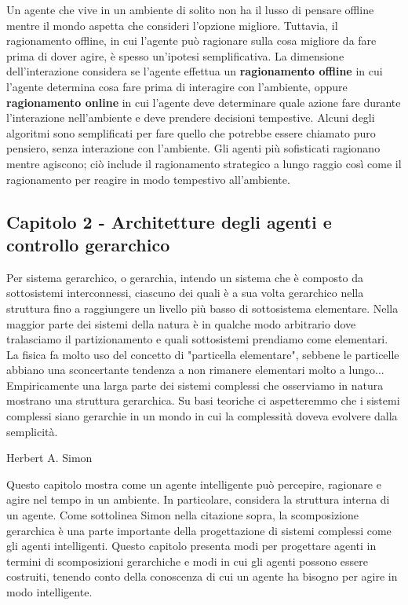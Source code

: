 \documentclass[a4paper]{extarticle}
\begin{document}
Un agente che vive in un ambiente di solito non ha il lusso di pensare offline mentre il mondo aspetta che consideri l'opzione migliore. Tuttavia, il ragionamento offline, in cui l'agente può ragionare sulla cosa migliore da fare prima di dover agire, è spesso un'ipotesi semplificativa. La dimensione dell'interazione considera se l'agente effettua un \textbf{ragionamento offline} in cui l'agente determina cosa fare prima di interagire con l'ambiente, oppure \textbf{ragionamento online} in cui l'agente deve determinare quale azione fare durante l'interazione nell'ambiente e deve prendere decisioni tempestive. Alcuni degli algoritmi sono semplificati per fare quello che potrebbe essere chiamato puro pensiero, senza interazione con l'ambiente. Gli agenti più sofisticati ragionano mentre agiscono; ciò include il ragionamento strategico a lungo raggio così come il ragionamento per reagire in modo tempestivo all'ambiente.

\subsection{Capitolo 2 - Architetture degli agenti e controllo gerarchico}

\begin{center}
Per sistema gerarchico, o gerarchia, intendo un sistema che è composto da sottosistemi interconnessi, ciascuno dei quali è a sua volta gerarchico nella struttura fino a raggiungere un livello più basso di sottosistema elementare. Nella maggior parte dei sistemi della natura è in qualche modo arbitrario dove tralasciamo il partizionamento e quali sottosistemi prendiamo come elementari. La fisica fa molto uso del concetto di "particella elementare", sebbene le particelle abbiano una sconcertante tendenza a non rimanere elementari molto a lungo...
Empiricamente una larga parte dei sistemi complessi che osserviamo in natura mostrano una struttura gerarchica. Su basi teoriche ci aspetteremmo che i sistemi complessi siano gerarchie in un mondo in cui la complessità doveva evolvere dalla semplicità.

Herbert A. Simon
\end{center}

Questo capitolo mostra come un agente intelligente può percepire, ragionare e agire nel tempo in un ambiente. In particolare, considera la struttura interna di un agente. Come sottolinea Simon nella citazione sopra, la scomposizione gerarchica è una parte importante della progettazione di sistemi complessi come gli agenti intelligenti. Questo capitolo presenta modi per progettare agenti in termini di scomposizioni gerarchiche e modi in cui gli agenti possono essere costruiti, tenendo conto della conoscenza di cui un agente ha bisogno per agire in modo intelligente.
\end{document}
